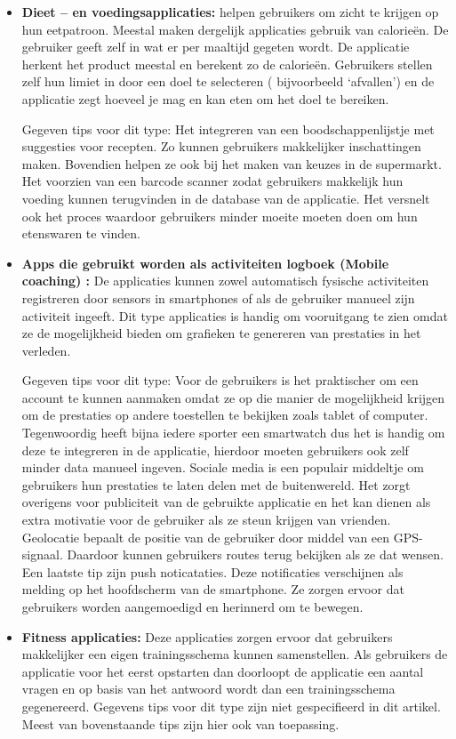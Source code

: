 \begin{itemize}
\setlength\itemsep{1em}
\item {\bf Dieet – en voedingsapplicaties:  } helpen gebruikers om zicht te krijgen op hun eetpatroon. Meestal maken dergelijk applicaties gebruik van calorieën. De gebruiker geeft zelf in wat er per maaltijd gegeten wordt. De applicatie herkent het product meestal en berekent zo de calorieën. Gebruikers stellen zelf hun limiet in door een doel te selecteren ( bijvoorbeeld ‘afvallen’) en de applicatie zegt hoeveel je mag en kan eten om het doel te bereiken.

Gegeven tips voor dit type: Het integreren van een boodschappenlijstje met suggesties voor recepten. Zo kunnen gebruikers makkelijker inschattingen maken. Bovendien helpen ze ook bij het maken van keuzes in de supermarkt. Het voorzien van een barcode scanner zodat gebruikers makkelijk hun voeding kunnen terugvinden in de database van de applicatie. Het versnelt ook het proces waardoor gebruikers minder moeite moeten doen om hun etenswaren te vinden.

\item {\bf Apps die gebruikt worden als activiteiten logboek (Mobile coaching) : } De applicaties kunnen zowel automatisch fysische activiteiten registreren door sensors in smartphones of als de gebruiker manueel zijn activiteit ingeeft. Dit type applicaties is handig om vooruitgang te zien omdat ze de mogelijkheid bieden om grafieken te genereren van prestaties in het verleden.

Gegeven tips voor dit type: Voor de gebruikers is het praktischer om een account te kunnen aanmaken omdat ze op die manier de mogelijkheid krijgen om de prestaties op andere toestellen te bekijken zoals tablet of computer. Tegenwoordig heeft bijna iedere sporter een smartwatch dus het is handig om deze te integreren in de applicatie, hierdoor moeten gebruikers ook zelf minder data manueel ingeven. Sociale media is een populair middeltje om gebruikers hun prestaties te laten delen met de buitenwereld. Het zorgt overigens voor publiciteit van de gebruikte applicatie en het kan dienen als extra motivatie voor de gebruiker als ze steun krijgen van vrienden. Geolocatie bepaalt de positie van de gebruiker door middel van een GPS-signaal. Daardoor kunnen gebruikers routes terug bekijken als ze dat wensen. Een laatste tip zijn push noticataties. Deze notificaties verschijnen als melding op het hoofdscherm van de smartphone. Ze zorgen ervoor dat gebruikers worden aangemoedigd en herinnerd om te bewegen.
\item {\bf  Fitness applicaties:  } Deze applicaties zorgen ervoor dat gebruikers makkelijker een eigen trainingsschema kunnen samenstellen. Als gebruikers de applicatie voor het eerst opstarten dan doorloopt de applicatie een aantal vragen en op basis van het antwoord wordt dan een trainingsschema gegenereerd.
Gegevens tips voor dit type zijn niet gespecifieerd in dit artikel. Meest van bovenstaande tips zijn hier ook van toepassing. 
\end{itemize}

